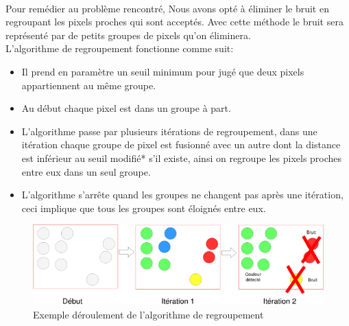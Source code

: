 \documentclass[12pt]{report}
\begin{document}
	\paragraph{}Pour remédier au problème rencontré, Nous avons opté à éliminer le bruit en regroupant les pixels proches qui sont acceptés. Avec cette méthode le bruit sera représenté par de petits groupes de pixels qu'on éliminera.\\
	L’algorithme de regroupement fonctionne comme suit:
	\begin{itemize}
		\item Il prend en paramètre un seuil minimum pour jugé que deux pixels appartiennent au même groupe.
		
		\item Au début chaque pixel est dans un groupe à part.
		
		\item L’algorithme passe par plusieurs itérations de regroupement, dans une itération chaque groupe de pixel est fusionné avec un autre dont la distance est inférieur au seuil modifié* s'il existe, ainsi on regroupe les pixels proches entre eux dans un seul groupe.
		
		\item L’algorithme s’arrête quand les groupes ne changent pas après une itération, ceci implique que tous les groupes sont éloignés entre eux.
	\end{itemize}
	\begin{figure}[H]
		\centering
		\includegraphics[scale=0.75]{imgs/grouping1.png}
		\caption{Exemple déroulement de l'algorithme de regroupement}
		\label{fig:Grouping}
	\end{figure}
\end{document}
